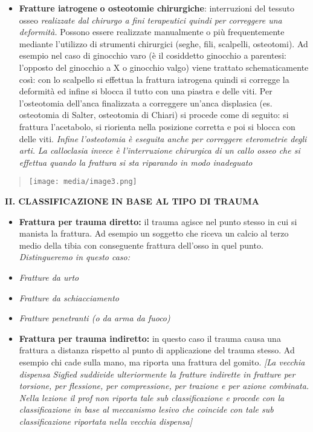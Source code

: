 \documentclass[]{article}
\begin{document}
\begin{itemize}
\item
  \textbf{Fratture iatrogene} \textbf{o osteotomie chirurgiche}:
  interruzioni del tessuto osseo \emph{realizzate dal chirurgo a fini
  terapeutici quindi per correggere una deformità.} Possono essere
  realizzate manualmente o più frequentemente mediante l'utilizzo di
  strumenti chirurgici (seghe, fili, scalpelli, osteotomi). Ad esempio
  nel caso di ginocchio varo (è il cosiddetto ginocchio a parentesi:
  l'opposto del ginocchio a X o ginocchio valgo) viene trattato
  schematicamente così: con lo scalpello si effettua la frattura
  iatrogena quindi si corregge la deformità ed infine si blocca il tutto
  con una piastra e delle viti. Per l'osteotomia dell'anca finalizzata a
  correggere un'anca displasica (es. osteotomia di Salter, osteotomia di
  Chiari) si procede come di seguito: si frattura l'acetabolo, si
  riorienta nella posizione corretta e poi si blocca con delle viti.
  \emph{Infine l'osteotomia è eseguita anche per correggere eterometrie
  degli arti.} \emph{La calloclasia invece è l'interruzione chirurgica
  di un callo osseo che si effettua quando la frattura si sta riparando
  in modo inadeguato}
\end{itemize}

\begin{quote}
\texttt{[image: media/image3.png]}
\end{quote}

\textbf{II. CLASSIFICAZIONE IN BASE AL TIPO DI TRAUMA}

\begin{itemize}
\item
  \textbf{Frattura per trauma diretto:} il trauma agisce nel punto
  stesso in cui si manista la frattura. Ad esempio un soggetto che
  riceva un calcio al terzo medio della tibia con conseguente frattura
  dell'osso in quel punto. \emph{Distingueremo in questo caso:}
\end{itemize}

\begin{itemize}
\item
  \emph{Fratture da urto}
\item
  \emph{Fratture da schiacciamento}
\item
  \emph{Fratture penetranti (o da arma da fuoco)}
\end{itemize}

\begin{itemize}
\item
  \textbf{Frattura per trauma indiretto:} in questo caso il trauma causa
  una frattura a distanza rispetto al punto di applicazione del trauma
  stesso. Ad esempio chi cade sulla mano, ma riporta una frattura del
  gomito. \emph{{[}La vecchia dispensa Sigfied suddivide ulteriormente
  la fratture indirette in fratture per torsione, per flessione, per
  compressione, per trazione e per azione combinata. Nella lezione il
  prof non riporta tale sub classificazione e procede con la
  classificazione in base al meccanismo lesivo che coincide con tale sub
  classificazione riportata nella vecchia dispensa{]}}
\end{itemize}
\end{document}
